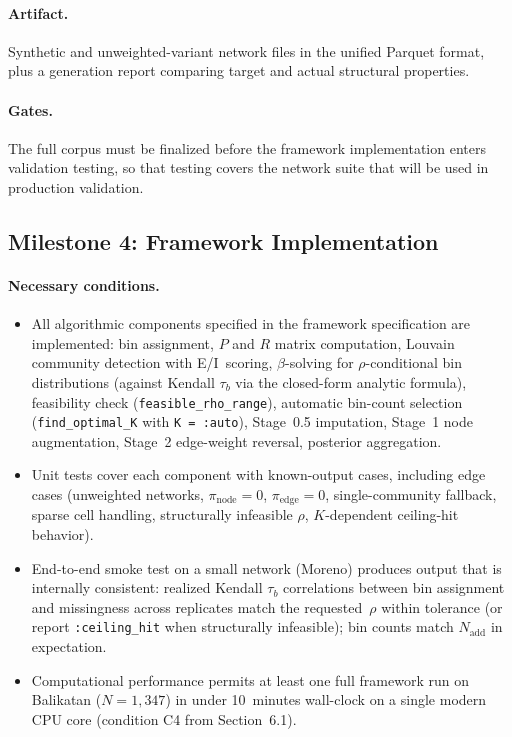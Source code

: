 \documentclass[11pt]{article}
\newcommand{\pinode}{\pi_{\text{node}}}
\newcommand{\piedge}{\pi_{\text{edge}}}
\newcommand{\Pmat}{P}
\newcommand{\Rmat}{R}
\begin{document}
\paragraph{Artifact.} Synthetic and unweighted-variant network files in the unified Parquet format, plus a generation report comparing target and actual structural properties.

\paragraph{Gates.} The full corpus must be finalized before the framework implementation enters validation testing, so that testing covers the network suite that will be used in production validation.

\subsection*{Milestone 4: Framework Implementation}

\paragraph{Necessary conditions.}
\begin{itemize}[leftmargin=*, itemsep=2pt]
  \item All algorithmic components specified in the framework specification are implemented: bin assignment, $\Pmat$ and $\Rmat$ matrix computation, Louvain community detection with E/I~scoring, $\beta$-solving for $\rho$-conditional bin distributions (against Kendall $\tau_b$ via the closed-form analytic formula), feasibility check (\texttt{feasible\_rho\_range}), automatic bin-count selection (\texttt{find\_optimal\_K} with \texttt{K = :auto}), Stage~0.5 imputation, Stage~1 node augmentation, Stage~2 edge-weight reversal, posterior aggregation.
  \item Unit tests cover each component with known-output cases, including edge cases (unweighted networks, $\pinode = 0$, $\piedge = 0$, single-community fallback, sparse cell handling, structurally infeasible $\rho$, $K$-dependent ceiling-hit behavior).
  \item End-to-end smoke test on a small network (Moreno) produces output that is internally consistent: realized Kendall $\tau_b$ correlations between bin assignment and missingness across replicates match the requested~$\rho$ within tolerance (or report \texttt{:ceiling\_hit} when structurally infeasible); bin counts match $N_{\text{add}}$ in expectation.
  \item Computational performance permits at least one full framework run on Balikatan ($N = 1{,}347$) in under 10~minutes wall-clock on a single modern CPU core (condition C4 from Section~6.1).
\end{itemize}
\end{document}
